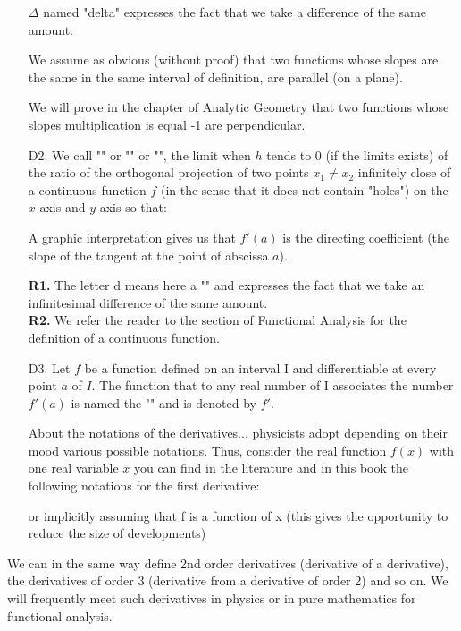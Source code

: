\begin{enumerate}
	\begin{tcolorbox}[title=Remark,colframe=black,arc=10pt]
$\Delta$ named "delta" expresses the fact that we take a difference of the same amount.
	\end{tcolorbox}
We assume as obvious (without proof) that two functions whose slopes are the same in the same interval of definition, are parallel (on a plane).
	\begin{tcolorbox}[title=Remark,colframe=black,arc=10pt]
We will prove in the chapter of Analytic Geometry that two functions whose slopes multiplication is equal -1 are perpendicular.
	\end{tcolorbox}
	\item[D2.] We call "" or "" or "", the limit when $h$ tends to $0$ (if the limits exists) of the ratio of the orthogonal projection of two points $x_1\neq x_2$ infinitely close  of a continuous function $f$ (in the sense that it does not contain "holes") on the $x$-axis and $y$-axis so that:
	
A graphic interpretation gives us that $f'(a)$ is the directing coefficient (the slope of the tangent at the point of abscissa $a$).
	\begin{tcolorbox}[title=Remarks,colframe=black,arc=10pt]
	\textbf{R1.} The letter $\mathrm{d}$ means here a "" and expresses the fact that we take an infinitesimal difference of the same amount.\\

	\textbf{R2.} We refer the reader to the section of Functional Analysis for the definition of a continuous function.
	\end{tcolorbox}
	\item[D3.] Let $f$ be a function defined on an interval I and differentiable at every point $a$ of $I$. The function that to any real number of I associates the number $f'(a)$ is named the "" and is denoted by $f'$.
	\begin{tcolorbox}[title=Remark,colframe=black,arc=10pt]
About the notations of the derivatives... physicists adopt depending on their mood various possible notations. Thus, consider the real function $f(x)$  with one real variable $x$ you can find in the literature and in this book the following notations for the first derivative:
	
or implicitly assuming that f is a function of x (this gives the opportunity to reduce the size of developments)
	
	\end{tcolorbox}
\end{enumerate}
We can in the same way define 2nd order derivatives (derivative of a derivative), the derivatives of order 3 (derivative from a derivative of order 2) and so on. We will  frequently meet such derivatives in physics or in pure mathematics for functional analysis.

